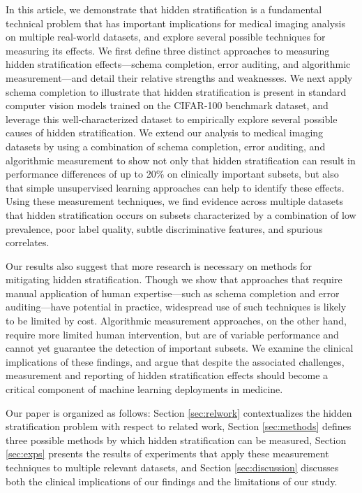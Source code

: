 \documentclass[sigconf]{acmart}
\begin{document}
In this article, we demonstrate that hidden stratification is a fundamental technical problem that has important implications for medical imaging analysis on multiple real-world datasets, and explore several possible techniques for measuring its effects. 
We first define three distinct approaches to measuring hidden stratification effects---schema completion, error auditing, and algorithmic measurement---and detail their relative strengths and weaknesses.
We next apply schema completion to illustrate that hidden stratification is present in standard computer vision models trained on the CIFAR-100 benchmark dataset, and leverage this well-characterized dataset to empirically explore several possible causes of hidden stratification.
We extend our analysis to medical imaging datasets by using a combination of schema completion, error auditing, and algorithmic measurement to show not only that hidden stratification can result in performance differences of up to 20\% on clinically important subsets, but also that simple unsupervised learning approaches can help to identify these effects.  
Using these measurement techniques, we find evidence across multiple datasets that hidden stratification occurs on subsets characterized by a combination of low prevalence, poor label quality, subtle discriminative features, and spurious correlates. 

Our results also suggest that more research is necessary on methods for mitigating hidden stratification.  
Though we show that approaches that require manual application of human expertise---such as schema completion and error auditing---have potential in practice, widespread use of such techniques is likely to be limited by cost.
Algorithmic measurement approaches, on the other hand, require more limited human intervention, but are of variable performance and cannot yet guarantee the detection of important subsets.
We examine the clinical implications of these findings, and argue that despite the associated challenges, measurement and reporting of hidden stratification effects should become a critical component of machine learning deployments in medicine.

Our paper is organized as follows: Section \ref{sec:relwork} contextualizes the hidden stratification problem with respect to related work, Section \ref{sec:methods} defines three possible methods by which hidden stratification can be measured, Section \ref{sec:exps} presents the results of experiments that apply these measurement techniques to multiple relevant datasets, and Section \ref{sec:discussion} discusses both the clinical implications of our findings and the limitations of our study.
\end{document}
